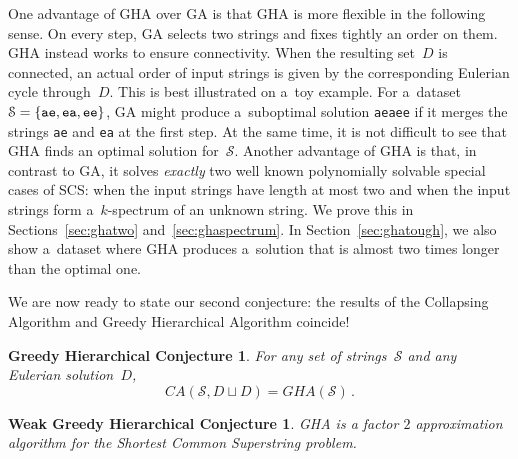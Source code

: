 One advantage of GHA over GA is that GHA is more flexible in the following sense. On every step, GA selects two strings and fixes tightly an order on them. GHA instead works to ensure connectivity. When the resulting set~$D$ is connected, an actual order of input strings is given by the corresponding Eulerian cycle through~$D$. This is best illustrated on a~toy example. For a~dataset $\mathcal{S}=\{{\tt ae}, {\tt ea}, {\tt ee}\}$, GA might produce a~suboptimal solution {\tt aeaee} if it merges the strings {\tt ae} and {\tt ea} at the first step. At the same time, it is not difficult to see that GHA finds an optimal solution for~$\mathcal{S}$. Another advantage of GHA is that, in contrast to GA, it solves {\em exactly} two well known polynomially solvable special cases of SCS: when the input strings have length at most two and when the input strings form a~$k$-spectrum of an unknown string. We prove this in Sections~\ref{sec:ghatwo} and~\ref{sec:ghaspectrum}. In Section~\ref{sec:ghatough}, we also show a~dataset where GHA produces a~solution that is almost two times longer than the optimal one.

We are now ready to state our second conjecture: the results of the Collapsing Algorithm and Greedy Hierarchical Algorithm coincide!
\newtheorem*{ghcc}{Greedy Hierarchical Conjecture}
\begin{ghcc}
For any set of strings~$\mathcal{S}$ and any Eulerian solution~$D$,
\[CA(\mathcal{S}, D \sqcup D) = GHA(\mathcal{S}) \, .\]
\end{ghcc}

\newtheorem*{wghcc}{Weak Greedy Hierarchical Conjecture}
\begin{wghcc}
GHA is a factor $2$ approximation algorithm for the Shortest Common Superstring problem.
\end{wghcc}